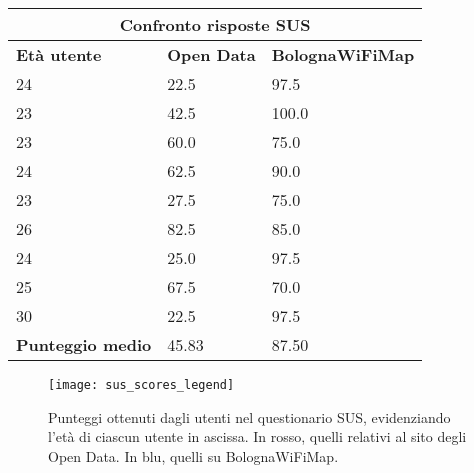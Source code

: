 \begin{center}
    \begin{table}[H]
        \centering
        \begin{tabularx}{\textwidth}{|X|X|X|}
            \hline
            \multicolumn{3}{|c|}{\textbf{Confronto risposte SUS}} \\
            \hline
            \textbf{Età utente} & \textbf{Open Data} & \textbf{BolognaWiFiMap} \\
            \hline
            24 & 22.5 & 97.5 \\
            23 & 42.5 & 100.0 \\
            23 & 60.0 & 75.0 \\
            24 & 62.5 & 90.0 \\
            23 & 27.5 & 75.0 \\
            26 & 82.5 & 85.0 \\
            24 & 25.0 & 97.5 \\
            25 & 67.5 & 70.0 \\
            30 & 22.5 & 97.5 \\
            \hline
            \textbf{Punteggio medio} & 45.83 & 87.50 \\
            \hline
        \end{tabularx}
        \caption[]{}
        \label{tab:sus_scores}
    \end{table}
\end{center}

\begin{figure}[H]
    \centering
    \texttt{[image: sus\_scores\_legend]}
    \caption[Punteggi ottenuti nel questionario SUS]{Punteggi ottenuti dagli utenti nel questionario SUS, evidenziando l'età di ciascun utente in ascissa. In rosso, quelli relativi al sito degli Open Data. In blu, quelli su BolognaWiFiMap.}
    \label{fig:sus_scores}
\end{figure}